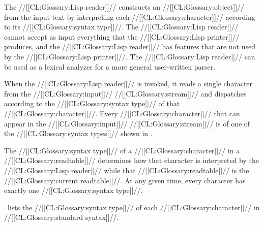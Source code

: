 \endSubsection%






The //[[CL:Glossary:Lisp reader]]// constructs an //[[CL:Glossary:object]]// 
from the input text by interpreting each //[[CL:Glossary:character]]// 
according to its //[[CL:Glossary:syntax type]]//.
The //[[CL:Glossary:Lisp reader]]// cannot accept as input 
everything that the //[[CL:Glossary:Lisp printer]]// produces,
and the //[[CL:Glossary:Lisp reader]]// has features that are not used by the //[[CL:Glossary:Lisp printer]]//.
The //[[CL:Glossary:Lisp reader]]// can be used as a lexical analyzer 
for a more general user-written parser.



When the //[[CL:Glossary:Lisp reader]]// is invoked, it reads a single character from 
the //[[CL:Glossary:input]]// //[[CL:Glossary:stream]]// and dispatches according to the
//[[CL:Glossary:syntax type]]// of that //[[CL:Glossary:character]]//.
Every //[[CL:Glossary:character]]// that can appear in the //[[CL:Glossary:input]]// //[[CL:Glossary:stream]]//
is of one of the //[[CL:Glossary:syntax types]]// shown in \figref\PossibleSyntaxTypes.


The //[[CL:Glossary:syntax type]]// of a //[[CL:Glossary:character]]// in a //[[CL:Glossary:readtable]]//
determines how that character is interpreted by the //[[CL:Glossary:Lisp reader]]//
while that //[[CL:Glossary:readtable]]// is the //[[CL:Glossary:current readtable]]//.
At any given time, every character has exactly one //[[CL:Glossary:syntax type]]//.



\Figref\CharSyntaxTypesInStdSyntax\ 
lists the //[[CL:Glossary:syntax type]]// of each //[[CL:Glossary:character]]// in //[[CL:Glossary:standard syntax]]//.


